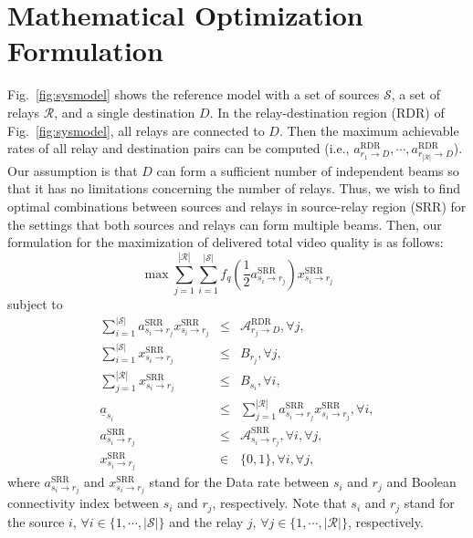 \documentclass[conference]{IEEEtran}
\begin{document}
\section{Mathematical Optimization Formulation}\label{sec:jscr}


Fig.~\ref{fig:sysmodel} shows the reference model with a set of sources $\mathcal{S}$, a set of relays $\mathcal{R}$, and a single destination $D$.
In the relay-destination region (RDR) of Fig.~\ref{fig:sysmodel}, all relays are connected to $D$.
Then the maximum achievable rates of all relay and destination pairs can be computed (i.e., $a_{r_{1}\rightarrow D}^{\text{RDR}},\cdots, a_{r_{|\mathcal{R}|}\rightarrow D}^{\text{RDR}}$). Our assumption is that $D$ can form a sufficient number of independent beams so that it has no limitations concerning the number of relays.
Thus, we wish to find optimal combinations between sources and relays in source-relay region (SRR) for the settings that both sources and relays can form multiple beams.
Then, our formulation for the maximization of delivered total video quality is as follows:
\begin{equation}
\max \sum_{j=1}^{|\mathcal{R}|}\sum_{i=1}^{|\mathcal{S}|}f_{q}\left(\frac{1}{2}a_{s_{i}\rightarrow r_{j}}^{\text{SRR}}\right)x_{s_{i}\rightarrow r_{j}}^{\text{SRR}}\label{eq:sss-objfunc}
\end{equation}
subject to
\begin{eqnarray}
\sum_{i=1}^{|\mathcal{S}|}a_{s_{i}\rightarrow r_{j}}^{\text{SRR}}x_{s_{i}\rightarrow r_{j}}^{\text{SRR}} &\leq& \mathcal{A}_{r_{j}\rightarrow D}^{\text{RDR}}, \forall j, \label{eq:sss-relay-capacity}\\
\sum_{i=1}^{|\mathcal{S}|}x_{s_{i}\rightarrow r_{j}}^{\text{SRR}} &\leq& B_{r_{j}}, \forall j, \label{eq:sss-relay-flow-const}\\
\sum_{j=1}^{|\mathcal{R}|}x_{s_{i}\rightarrow r_{j}}^{\text{SRR}} &\leq& B_{s_{i}}, \forall i, \label{eq:sss-source-flow-const}\\
\underline{a}_{s_{i}} &\leq& \sum_{j=1}^{|\mathcal{R}|} a_{s_{i}\rightarrow r_{j}}^{\text{SRR}}x_{s_{i}\rightarrow r_{j}}^{\text{SRR}}, \forall i,\label{eq:sss-a-add}\\
a_{s_{i}\rightarrow r_{j}}^{\text{SRR}} &\leq& \mathcal{A}_{s_{i}\rightarrow r_{j}}^{\text{SRR}}, \forall i, \forall j,\label{eq:sss-a-leq} \\
x_{s_{i}\rightarrow r_{j}}^{\text{SRR}} &\in& \{0,1\}, \forall i, \forall j,\label{eq:sss-x-01}
\end{eqnarray}
where $a_{s_{i}\rightarrow r_{j}}^{\text{SRR}}$ and $x_{s_{i}\rightarrow r_{j}}^{\text{SRR}}$ stand for the Data rate between $s_{i}$ and $r_{j}$ and Boolean connectivity index between $s_{i}$ and $r_{j}$, respectively. Note that $s_{i}$ and $r_{j}$ stand for the source $i$, $\forall i\in \{1,\cdots,|\mathcal{S}|\}$ and the relay $j$, $\forall j\in \{1,\cdots,|\mathcal{R}|\}$, respectively.
\end{document}
